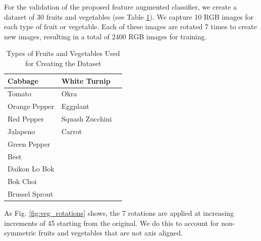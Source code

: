 For the validation of the proposed feature augmented classifier, we create a dataset of 30 fruits and vegetables (see Table \ref{tab:veg_types}). We capture 10 RGB images for each type of fruit or vegetable. Each of these images are rotated 7 times to create new images, resulting in a total of 2400 RGB images for training.

\bgroup
\def\arraystretch{1.5}
\begin{table}[htbp]
	\caption{Types of Fruits and Vegetables Used for Creating the Dataset}
	\begin{center}
		\begin{tabular}{| >{\centering\arraybackslash}m{2cm} | >{\centering\arraybackslash}m{2cm} | >{\centering\arraybackslash}m{2cm} |}
			\hline
			Cabbage & White Turnip & \\
			\hline
			Tomato & Okra & \\
			\hline
			Orange Pepper & Eggplant & \\
			\hline
			Red Pepper & Squash Zucchini & \\
			\hline
			Jalapeno & Carrot & \\
			\hline
			Green Pepper & & \\
			\hline
			Beet & & \\
			\hline
			Daikon Lo Bok & & \\
			\hline
			Bok Choi & & \\
			\hline
			Brussel Sprout & & \\
			\hline
		\end{tabular}
		\label{tab:veg_types}
	\end{center}
\end{table}
\egroup

As Fig. \ref{fig:veg_rotations} shows, the 7 rotations are applied at increasing increments of 45\degree{} starting from the original. We do this to account for non-symmetric fruits and vegetables that are not axis aligned.

